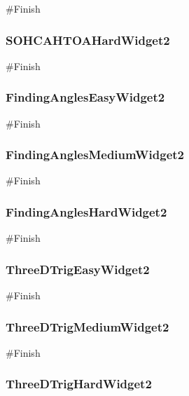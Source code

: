 \begin{landscape}
\begin{python}
#Finish
\end{python}

\subsubsection{SOHCAHTOAHardWidget2}

\begin{python}
#Finish
\end{python}

\subsubsection{FindingAnglesEasyWidget2}

\begin{python}
#Finish
\end{python}

\subsubsection{FindingAnglesMediumWidget2}

\begin{python}
#Finish
\end{python}

\subsubsection{FindingAnglesHardWidget2}

\begin{python}
#Finish
\end{python}

\subsubsection{ThreeDTrigEasyWidget2}

\begin{python}
#Finish
\end{python}

\subsubsection{ThreeDTrigMediumWidget2}

\begin{python}
#Finish
\end{python}

\subsubsection{ThreeDTrigHardWidget2}


\end{landscape}
